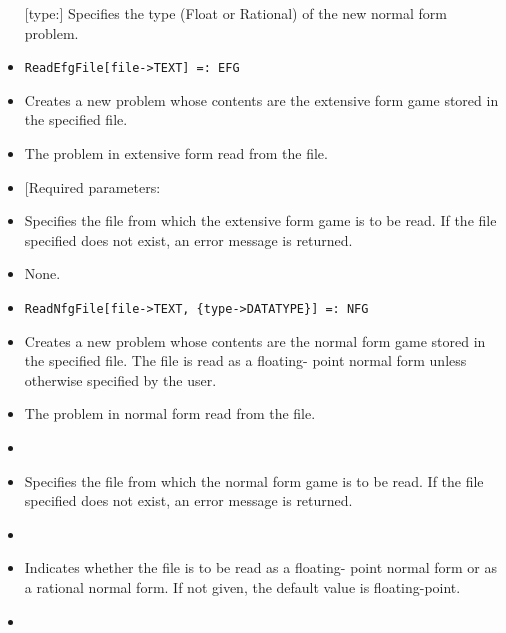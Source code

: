 \begin{itemize}
[type:] Specifies the type (Float or Rational) of the new normal form
problem.
\ed
\ed

\item
\protect \large \begin{verbatim}
ReadEfgFile[file->TEXT] =: EFG
\end{verbatim}\normalsize

\bd
\item
[Description:] Creates a new problem whose contents are the extensive
form game stored in the specified file.
\item
[Return value:] The problem in extensive form read from the file.
\item

[Required parameters:

\bd
\item
[file:] Specifies the file from which the extensive form game is to be
read.  If the file specified does not exist, an error message is
returned.
\ed

\item
[Optional parameters:] None.
\ed

\item
\protect \large \begin{verbatim}
ReadNfgFile[file->TEXT, {type->DATATYPE}] =: NFG
\end{verbatim}\normalsize

\bd
\item
[Description:] Creates a new problem whose contents are the normal
form game stored in the specified file.  The file is read as a
floating- point normal form unless otherwise specified by the user.
\item
[Return value:] The problem in normal form read from the file.
\item
[Required parameters:]\hfil\null

\bd
\item
[file:] Specifies the file from which the normal form game is to be
read.  If the file specified does not exist, an error message is
returned.
\ed

\item
[Optional parameters:]\hfil\null
	

\bd
\item
[type:] Indicates whether the file is to be read as a floating- point
normal form or as a rational normal form.  If not given, the default
value is floating-point.
\ed
\ed

\item


\end{itemize}
